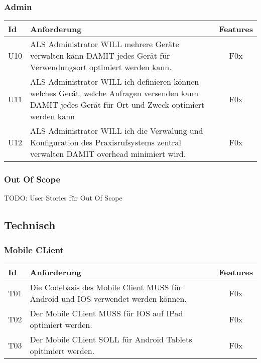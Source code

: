 \subsubsection*{Admin}

\begin{table}[h]
    \centering
    \begin{tabular}{|l|p{13cm}|c|}
        \hline
        \textbf{Id} & \textbf{Anforderung}                                                                                                                                 & \textbf{Features} \\
        \hline
        U10         & ALS Administrator WILL mehrere Geräte verwalten kann DAMIT jedes Gerät für Verwendungsort optimiert werden kann. & F0x \\
        \hline
        U11         & ALS Administrator WILL ich definieren können welches Gerät, welche Anfragen versenden kann DAMIT jedes Gerät für Ort und Zweck optimiert werden kann & F0x \\
        \hline
        U12         & ALS Administrator WILL ich die Verwalung und Konfiguration des Praxisrufsystems zentral verwalten DAMIT overhead minimiert wird. & F0x \\
        \hline
    \end{tabular}\label{tab:userstories2}
\end{table}

\subsubsection*{Out Of Scope}

TODO: User Stories für Out Of Scope

\subsection{Technisch}\label{subsec:technisch}


\subsubsection*{Mobile CLient}

\begin{table}[h]
    \centering
    \begin{tabular}{|l|p{13cm}|c|}
        \hline
        \textbf{Id} & \textbf{Anforderung}                                                              & \textbf{Features} \\
        \hline
        T01         & Die Codebasis des Mobile Client MUSS für Android und IOS verwendet werden können. & F0x \\
        \hline
        T02         & Der Mobile CLient MUSS für IOS auf IPad optimiert werden.                         & F0x               \\
        \hline
        T03         & Der Mobile CLient SOLL für Android Tablets opitimiert werden.                     & F0x               \\
        \hline
    \end{tabular}\label{tab:userstories3}
\end{table}
\clearpage

